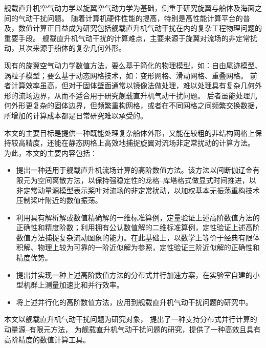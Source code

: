 
{}
\begin{cabstract}
舰载直升机空气动力学以旋翼空气动力学为基础，侧重于研究旋翼与船体及海面之间的气动干扰问题。
随着计算机硬件性能的提高，特别是高性能计算平台的普及，数值计算正日益成为研究包括舰载直升机气动干扰在内的复杂工程物理问题的重要手段。
舰载直升机气动干扰的计算难点，主要来源于旋翼对流场的非定常扰动，其次来源于船体的复杂几何外形。

现有的旋翼空气动力学数值方法，要么基于简化的物理模型，如：自由尾迹模型、涡粒子模型；要么基于动态网格技术，如：变形网格、滑动网格、重叠网格。
前者计算效率虽高，但对于固体壁面通常以镜像法做处理，难以处理具有复杂几何外形的流场边界，从而不适合用于研究舰载直升机气动干扰问题。
后者虽能处理几何外形更复杂的固体边界，但频繁重构网格，或者在不同网格之间频繁交换数据，所增加的计算成本都是日常研究难以承受的。

本文的主要目标是提供一种既能处理复杂船体外形，又能在较粗的非结构网格上保持较高精度，还能在静态网格上高效地捕捉旋翼对流场非定常扰动的计算方法。
为此，本文的主要内容包括：
\begin{itemize}[wide]
\item 提出一种适用于舰载直升机流场计算的高阶数值方法。该方法以间断伽辽金有限元为空间离散方法，以保持强稳定性的龙格--库塔格式做显式时间推进，以非定常动量源模型表示桨叶对流场的非定常扰动，以加权基本无振荡重构技术压制桨叶附近的数值振荡。
\item 利用具有解析解或数值精确解的一维标准算例，定量验证上述高阶数值方法的正确性和精度阶数；利用拥有公认数值解的二维标准算例，定性验证上述高阶数值方法捕捉复杂流动图象的能力。在此基础上，以数学上等价于经典有限体积解、物理上较为可靠的一阶近似解为参照，定性验证三阶近似解的正确性和精度优势。
\item 提出并实现一种上述高阶数值方法的分布式并行加速方案，在实验室自建的小型机群上测量加速比和并行效率。
\item 将上述并行化的高阶数值方法，应用到舰载直升机气动干扰问题的研究中。
\end{itemize}

本文以舰载直升机气动干扰问题为研究对象，
提出了一种支持分布式并行计算的动量源--有限元方法，
为舰载直升机气动干扰问题的研究，提供了一种高效且具有高阶精度的数值计算工具。
\end{cabstract}

